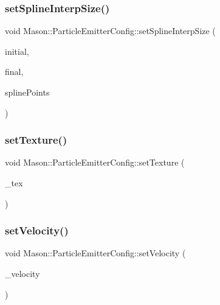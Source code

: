 \subsubsection{\texorpdfstring{set\+Spline\+Interp\+Size()}{setSplineInterpSize()}}
{\footnotesize\ttfamily void Mason\+::\+Particle\+Emitter\+Config\+::set\+Spline\+Interp\+Size (\begin{DoxyParamCaption}\item[{float}]{initial,  }\item[{float}]{final,  }\item[{std\+::vector$<$ glm\+::vec2 $>$}]{spline\+Points }\end{DoxyParamCaption})\hspace{0.3cm}{\ttfamily [inline]}}

\hypertarget{struct_mason_1_1_particle_emitter_config_a92978f0e01ba1078889a3f288ff0c02b}{}\label{struct_mason_1_1_particle_emitter_config_a92978f0e01ba1078889a3f288ff0c02b} 
\subsubsection{\texorpdfstring{set\+Texture()}{setTexture()}}
{\footnotesize\ttfamily void Mason\+::\+Particle\+Emitter\+Config\+::set\+Texture (\begin{DoxyParamCaption}\item[{S\+R\+E\+::\+Texture $\ast$}]{\+\_\+tex }\end{DoxyParamCaption})\hspace{0.3cm}{\ttfamily [inline]}}

\hypertarget{struct_mason_1_1_particle_emitter_config_ae5eafd4808934831fb271304c24b6af7}{}\label{struct_mason_1_1_particle_emitter_config_ae5eafd4808934831fb271304c24b6af7} 
\subsubsection{\texorpdfstring{set\+Velocity()}{setVelocity()}}
{\footnotesize\ttfamily void Mason\+::\+Particle\+Emitter\+Config\+::set\+Velocity (\begin{DoxyParamCaption}\item[{glm\+::vec3}]{\+\_\+velocity }\end{DoxyParamCaption})\hspace{0.3cm}{\ttfamily [inline]}}



